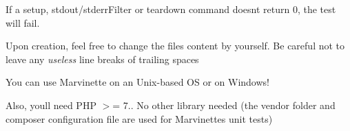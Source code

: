 If a {\ttfamily setup}, {\ttfamily stdout/stderr\+Filter} or {\ttfamily teardown} command doesn\textquotesingle{}t return 0, the test will fail.

Upon creation, feel free to change the files\textquotesingle{} content by yourself. Be careful not to leave any {\itshape useless} line breaks of trailing spaces 



You can use Marvinette on an Unix-\/based OS or on Windows!

Also, you\textquotesingle{}ll need P\+HP $>$= 7.. No other library needed (the {\ttfamily vendor} folder and composer configuration file are used for Marvinette\textquotesingle{}s unit tests) 



\href{https://sonarcloud.io/dashboard?id=Arthi-chaud_Marvinette}{\tt } 
